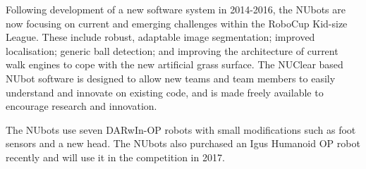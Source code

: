 \documentclass{llncs}
\begin{document}
Following development of a new software system in 2014-2016, the NUbots are now focusing on current and emerging challenges within the RoboCup Kid-size League. These include robust, adaptable image segmentation; improved localisation; generic ball detection; and improving the architecture of current walk engines to cope with the new artificial grass surface. The NUClear based NUbot software is designed to allow new teams and team members to easily understand and innovate on existing code, and is made freely available to encourage research and innovation.




The NUbots use seven DARwIn-OP robots with small modifications such as foot sensors and a new head. The NUbots also purchased an Igus Humanoid OP robot recently and will use it in the competition in 2017.
\end{document}
